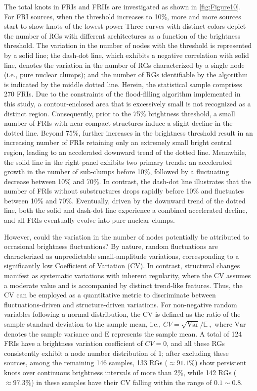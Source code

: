 \documentclass{aa}
\begin{document}
The total knots in FRIs and FRIIs are investigated as shown in \autoref {fig:Figure10}. 
For FRI sources, when the threshold increases to 10\%, more and more sources start to show knots of the lowest power
Three curves with distinct colors depict the number of RGs with different architectures as a function of the brightness threshold.
The variation in the number of nodes with the threshold is represented by a solid line; the dash-dot line, which exhibits a negative correlation with solid line, denotes the variation in the number of RGs characterized by a single node (i.e., pure nuclear clumps); and the number of RGs identifiable by the algorithm is indicated by the middle dotted line. Herein, the statistical sample comprises 270 FRIs. 
Due to the constraints of the flood-filling algorithm implemented in this study, a contour-enclosed area that is excessively small is not recognized as a distinct region. Consequently, prior to the 75\% brightness threshold, a small number of FRIs with near-compact structures induce a slight decline in the dotted line. Beyond 75\%, further increases in the brightness threshold result in an increasing number of FRIs retaining only an extremely small bright central region, leading to an accelerated downward trend of the dotted line. Meanwhile, the solid line in the right panel exhibits two primary trends: an accelerated growth in the number of sub-clumps before 10\%, followed by a fluctuating decrease between 10\% and 70\%. In contrast, the dash-dot line illustrates that the number of FRIs without substructures drops rapidly before 10\% and fluctuates between 10\% and 70\%. Eventually, driven by the downward trend of the dotted line, both the solid and dash-dot line experience a combined accelerated decline, and all FRIs eventually evolve into pure nuclear clumps.

However, could the variation in the number of nodes potentially be attributed to occasional brightness fluctuations? By nature, random fluctuations are characterized as unpredictable small-amplitude variations, corresponding to a significantly low Coefficient of Variation (CV). In contrast, structural changes manifest as systematic variations with inherent regularity, where the CV assumes a moderate value and is accompanied by distinct trend-like features. 
Thus, the CV can be employed as a quantitative metric to discriminate between fluctuations-driven and structure-driven variations. For non-negative random variables following a normal distribution, the CV is defined as the ratio of the sample standard deviation to the sample mean, i.e., $CV =\sqrt{\mathrm{Var}}/\mathbb{E} \ ,$ where $\mathrm{Var}$ denotes the sample variance and $\mathrm{E}$ represents the sample mean. 
A total of 124 FRIs have a brightness variation coefficient of $CV=0$, and all these RGs consistently exhibit a node number distribution of 1; after excluding these sources, among the remaining 146 samples, 133 RGs ($\approx 91.1\%$) show persistent knots over continuous brightness intervals of more than 2\%, while 142 RGs ($\approx 97.3\%$) in these samples have their CV falling within the range of $0.1 \sim 0.8$.
\end{document}
